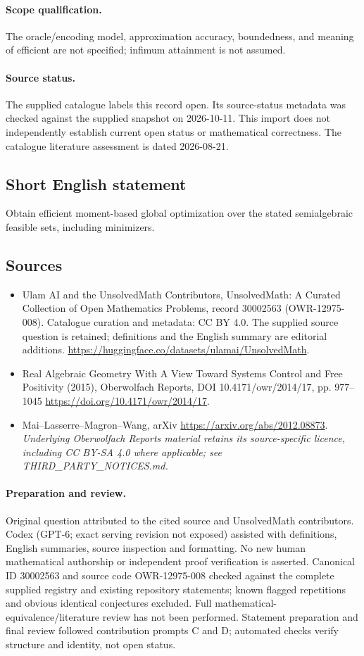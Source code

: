 \documentclass[11pt]{article}
\begin{document}
\paragraph{Scope qualification.}
The oracle/encoding model, approximation accuracy, boundedness, and meaning of efficient are not specified; infimum attainment is not assumed.
\paragraph{Source status.}
The supplied catalogue labels this record open. Its source-status metadata was checked against the supplied snapshot on 2026-10-11. This import does not independently establish current open status or mathematical correctness. The catalogue literature assessment is dated 2026-08-21.
\subsection{Short English statement}
Obtain efficient moment-based global optimization over the stated semialgebraic feasible sets, including minimizers.
\subsection{Sources}
\begin{itemize}
\item[S1] Ulam AI and the UnsolvedMath Contributors, UnsolvedMath: A Curated Collection of Open Mathematics Problems, record 30002563 (OWR-12975-008). Catalogue curation and metadata: CC BY 4.0. The supplied source question is retained; definitions and the English summary are editorial additions.
\url{https://huggingface.co/datasets/ulamai/UnsolvedMath}.
\item[S2] Real Algebraic Geometry With A View Toward Systems Control and Free Positivity (2015), Oberwolfach Reports, DOI 10.4171/owr/2014/17, pp. 977--1045
\url{https://doi.org/10.4171/owr/2014/17}.
\item[S3] Mai--Lasserre--Magron--Wang, arXiv
\url{https://arxiv.org/abs/2012.08873}.
\textit{Underlying Oberwolfach Reports material retains its source-specific licence, including CC BY-SA 4.0 where applicable; see THIRD\_PARTY\_NOTICES.md.}
\end{itemize}
\paragraph{Preparation and review.}
Original question attributed to the cited source and UnsolvedMath contributors. Codex (GPT-6; exact serving revision not exposed) assisted with definitions, English summaries, source inspection and formatting. No new human mathematical authorship or independent proof verification is asserted. Canonical ID 30002563 and source code OWR-12975-008 checked against the complete supplied registry and existing repository statements; known flagged repetitions and obvious identical conjectures excluded. Full mathematical-equivalence/literature review has not been performed. Statement preparation and final review followed contribution prompts C and D; automated checks verify structure and identity, not open status.
\label{end:30002563}
\end{document}
